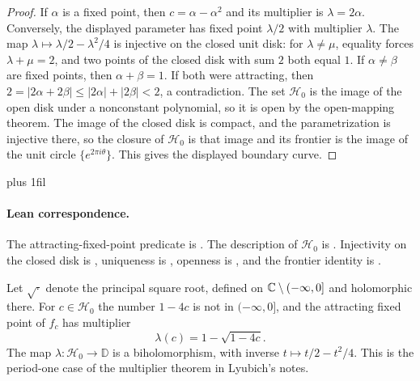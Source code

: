 \begin{proof}
If $\alpha$ is a fixed point, then
$c=\alpha-\alpha^2$ and its multiplier is $\lambda=2\alpha$.
Conversely, the displayed parameter has fixed point $\lambda/2$
with multiplier $\lambda$.  The map
$\lambda\mapsto\lambda/2-\lambda^2/4$ is injective on the closed
unit disk: for $\lambda\ne\mu$, equality forces $\lambda+\mu=2$, and
two points of the closed disk with sum $2$ both equal $1$.
If $\alpha\ne\beta$ are fixed points, then $\alpha+\beta=1$.  If both were
attracting, then $2=|2\alpha+2\beta|\le|2\alpha|+|2\beta|<2$, a contradiction.
The set $\mathcal H_0$ is the image of the open disk under a nonconstant
polynomial, so it is open by the open-mapping theorem.  The image of the
closed disk is compact, and the parametrization is injective there, so the
closure of $\mathcal H_0$ is that image and its frontier is the image of the
unit circle $\{e^{2\pi i\theta}\}$.  This gives the displayed boundary curve.
\end{proof}

{\rightskip=0pt plus 1fil
\paragraph{Lean correspondence.}
The attracting-fixed-point predicate is
.
The description of $\mathcal H_0$ is
.
Injectivity on the closed disk is
,
uniqueness is
,
openness is
,
and the frontier identity is
.\par}

\begin{proposition}
\label{prop:multiplier-cardioid}
Let $\sqrt{\cdot}$ denote the principal square root, defined on $\mathbb C\setminus(-\infty,0]$ and holomorphic there.  For $c\in\mathcal H_0$ the number $1-4c$ is not in $(-\infty,0]$, and the attracting fixed point of $f_c$ has multiplier
\[
 \lambda(c)=1-\sqrt{1-4c}.
\]
The map $\lambda\colon\mathcal H_0\to\mathbb D$ is a biholomorphism, with inverse $t\mapsto t/2-t^2/4$.  This is the period-one case of the multiplier theorem in Lyubich's notes.
\end{proposition}

